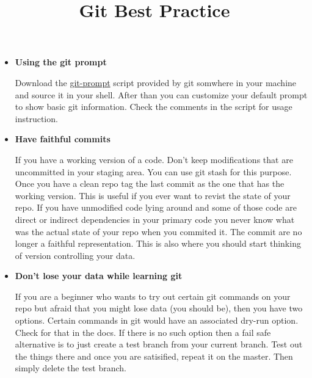 \documentclass{../template/texnote}
\title{Git Best Practice}
\begin{document}
    \maketitle {}
\begin{itemize}
\item \textbf{Using the git prompt}

Download the \href{https://github.com/git/git/blob/master/contrib/completion/git-prompt.sh}{git-prompt} script provided by git somwhere in your machine and source it in your shell. After than you can customize your default prompt to show basic git information. Check the comments in the script for usage instruction.
\item \textbf{Have faithful commits}

If you have a working version of a code. Don’t keep modifications that are uncommitted in your staging area. You can use git stash for this purpose. Once you have a clean repo tag the last commit as the one that has the working version. This is useful if you ever want to revist the state of your repo. If you have unmodified code lying around and some of those code are direct or indirect dependencies in your primary code you never know what was the actual state of your repo when you commited it. The commit are no longer a faithful representation. This is also where you should start thinking of version controlling your data.

\item \textbf{Don't lose your data while learning git}

If you are a beginner who wants to try out certain git commands on your repo but afraid that you might lose data (you should be), then you have two options. Certain commands in git would have an associated dry-run option. Check for that in the docs. If there is no such option then a fail safe alternative is to just create a test branch from your current branch. Test out the things there and once you are satisified, repeat it on the master. Then simply delete the test branch.

\end{itemize}
    \printbibliography
\end{document}

